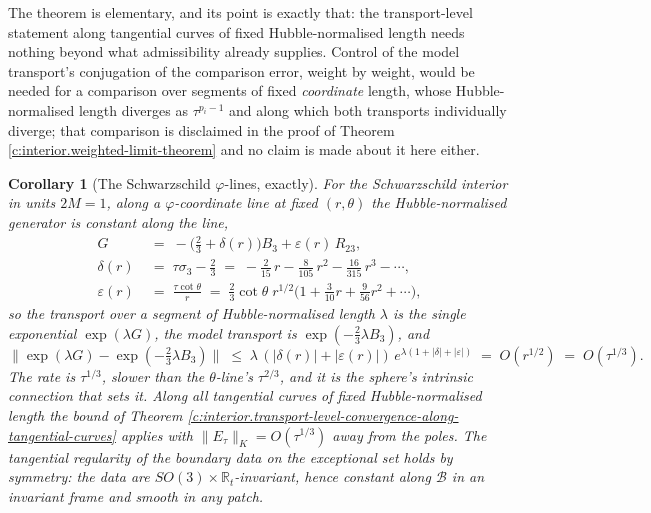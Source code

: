 \documentclass[11pt]{article}
\newtheorem{corollary}[theorem]{Corollary}
\theoremstyle{definition}
\theoremstyle{plain}
\newcommand{\changedmark}[2]{\marginpar{\raggedright\scriptsize\color{#1}#2}}
\providecommand{\R}{}\renewcommand{\R}{\mathbb{R}}
\begin{document}
\label{c:note.interior.setting-transport-along-tangential-curves-lines-2}
The theorem is elementary, and its point is exactly that: the transport-level statement along tangential curves of fixed Hubble-normalised length needs nothing beyond what admissibility already supplies. Control of the model transport's conjugation of the comparison error, weight by weight, would be needed for a comparison over segments of fixed \emph{coordinate} length, whose Hubble-normalised length diverges as $\tau^{p_{i} - 1}$ and along which both transports individually diverge; that comparison is disclaimed in the proof of Theorem \ref{c:interior.weighted-limit-theorem} and no claim is made about it here either.

\begin{corollary}[The Schwarzschild $\varphi$-lines, exactly]\label{c:interior.schwarzschild-lines-exactly}
\changedmark{BurntOrange}{changed since the deposit}
For the Schwarzschild interior in units $2M = 1$, along a $\varphi$-coordinate line at fixed $(r, \theta)$ the Hubble-normalised generator is constant along the line,
\begin{align*}
G \;&=\; -\bigl(\tfrac23 + \delta(r)\bigr) B_{3} + \varepsilon(r)\, R_{23}, \\
\delta(r) \;&=\; \tau\sigma_{3} - \tfrac23 \;=\; -\tfrac{2}{15}\,r - \tfrac{8}{105}\,r^{2} - \tfrac{16}{315}\,r^{3} - \cdots, \\
\varepsilon(r) \;&=\; \frac{\tau\cot\theta}{r} \;=\; \tfrac23\cot\theta\; r^{1/2}\bigl(1 + \tfrac{3}{10} r + \tfrac{9}{56} r^{2} + \cdots\bigr),
\end{align*}
so the transport over a segment of Hubble-normalised length $\lambda$ is the single exponential $\exp(\lambda G)$, the model transport is $\exp(-\tfrac23\lambda B_{3})$, and
\[
\|\exp(\lambda G) - \exp(-\tfrac23\lambda B_{3})\| \;\le\; \lambda\,(|\delta(r)| + |\varepsilon(r)|)\,e^{\lambda(1 + |\delta| + |\varepsilon|)} \;=\; O(r^{1/2}) \;=\; O(\tau^{1/3}) .
\]
The rate is $\tau^{1/3}$, slower than the $\theta$-line's $\tau^{2/3}$, and it is the sphere's intrinsic connection that sets it. Along all tangential curves of fixed Hubble-normalised length the bound of Theorem \ref{c:interior.transport-level-convergence-along-tangential-curves} applies with $\|E_{\tau}\|_{K} = O(\tau^{1/3})$ away from the poles. The tangential regularity of the boundary data on the exceptional set holds by symmetry: the data are $SO(3) \times \R_{t}$-invariant, hence constant along $\mathcal{B}$ in an invariant frame and smooth in any patch.
\end{corollary}
\end{document}
